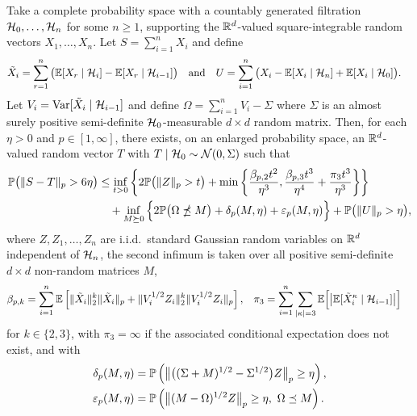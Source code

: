 \begin{theorem}%
  \label{thm:sa_dependent}

  Take a complete probability space with a countably generated
  filtration $\cH_0, \ldots, \cH_n$
  for some $n \geq 1$, supporting the
  $\R^d$-valued square-integrable random vectors
  $X_1, \ldots, X_n$.
  Let $S = \sum_{i=1}^n X_i$ and
  define
  \begin{align*}
    \tilde X_i
    &=
    \sum_{r=1}^n \big(\E[X_{r} \mid \cH_{i}] - \E[X_{r} \mid \cH_{i-1}]\big)
    & &\text{and}
    &U
    &=
    \sum_{i=1}^{n} \big(
    X_i - \E[ X_i \mid \cH_n]
    + \E[ X_i \mid \cH_0 ]
    \big).
  \end{align*}
  Let $V_i = \Var[\tilde X_i \mid \cH_{i-1}]$ and
  define $\Omega = \sum_{i=1}^n V_i - \Sigma$
  where $\Sigma$ is an almost surely positive semi-definite $\cH_0$-measurable
  $d \times d$ random matrix.
  Then, for each $\eta > 0$ and $p \in [1,\infty]$,
  there exists, on an enlarged probability space,
  an $\R^d$-valued random vector $T$ with
  $T \mid \cH_0 \sim \cN(0, \Sigma)$ such that
  \begin{align}
    \label{eq:sa_dependent}
    \P\big(\|S-T\|_p > 6\eta\big)
    &\leq
    \inf_{t>0}
    \left\{
    2 \P\big( \|Z\|_p > t \big)
    + \min\left\{
    \frac{\beta_{p,2} t^2}{\eta^3},
    \frac{\beta_{p,3} t^3}{\eta^4}
    + \frac{\pi_3 t^3}{\eta^3}
    \right\}
    \right\} \nonumber \\
    &\quad+
    \inf_{M \succeq 0}
    \Big\{ 2 \P\big(\Omega \npreceq M\big) + \delta_p(M,\eta)
    + \varepsilon_p(M, \eta)\Big\}
    +\P\big(\|U\|_p>\eta\big),
  \end{align}
  where $Z, Z_1,\dots ,Z_n$ are i.i.d.\ standard Gaussian random variables on
  $\R^d$ independent of $\cH_n$,
  the second infimum is taken over all positive semi-definite
  $d \times d$ non-random matrices $M$,
  \begin{align*}
    \beta_{p,k}
    &=
    \sum_{i=1}^n \E\left[\| \tilde X_i \|^k_2 \| \tilde X_i \|_p
      + \|V_i^{1/2} Z_i \|^k_2 \|V_i^{1/2} Z_i \|_p \right],
    &\pi_3
    &=
    \sum_{i=1}^{n}
    \sum_{|\kappa| = 3}
    \E \Big[ \big|
      \E [ \tilde X_i^\kappa \mid \cH_{i-1} ]
      \big| \Big]
  \end{align*}
  for $k \in \{2, 3\}$, with $\pi_3 = \infty$ if the associated
  conditional expectation does not exist, and with
  \begin{align*}
    \delta_p(M,\eta)
    &=
    \P\left(
      \big\|\big((\Sigma +M)^{1/2}- \Sigma^{1/2}\big) Z\big\|_p
      \geq \eta
    \right), \\
    \varepsilon_p(M, \eta)
    &=
    \P\left(\big\| (M - \Omega)^{1/2} Z \big\|_p\geq \eta, \
      \Omega \preceq M\right).
  \end{align*}
\end{theorem}

